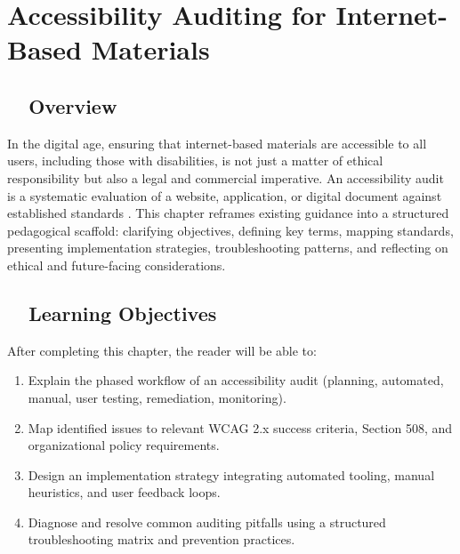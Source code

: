 \chapter{Accessibility Auditing for Internet-Based Materials}
\label{chap:accessibility-auditing}

\section{~~Overview}\label{sec:intro-auditing}
In the digital age, ensuring that internet-based materials are accessible to all users, including those with disabilities, is not just a matter of ethical responsibility but also a legal and commercial imperative. An accessibility audit is a systematic evaluation of a website, application, or digital document against established  standards \supercite{DisabilityRightsAuditing}. This chapter reframes existing guidance into a structured pedagogical scaffold: clarifying objectives, defining key terms, mapping standards, presenting implementation strategies, troubleshooting patterns, and reflecting on ethical and future-facing considerations.

\section{~~Learning Objectives}\label{sec:learning-objectives-auditing}
After completing this chapter, the reader will be able to:
\begin{enumerate}
	\item Explain the phased workflow of an accessibility audit (planning, automated, manual, user testing, remediation, monitoring).
	\item Map identified issues to relevant WCAG 2.x success criteria, Section 508, and organizational policy requirements.
	\item Design an implementation strategy integrating automated tooling, manual heuristics, and user feedback loops.
	\item Diagnose and resolve common auditing pitfalls using a structured troubleshooting matrix and prevention practices.
\end{enumerate}


